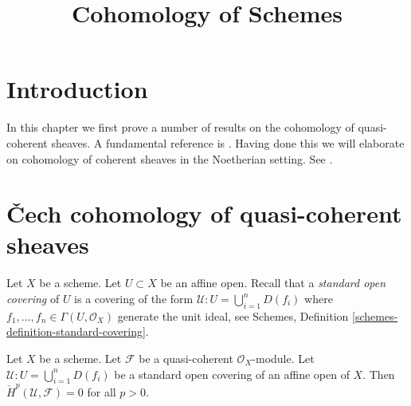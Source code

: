 

%


\title{Cohomology of Schemes}


\maketitle

\label{section-phantom}

\tableofcontents

\section{Introduction}
\label{section-introduction}

\noindent
In this chapter we first prove a number of results on the cohomology of
quasi-coherent sheaves. A fundamental reference is \cite{EGA}.
Having done this we will elaborate on cohomology of
coherent sheaves in the Noetherian setting. See \cite{FAC}.







\section{{\v C}ech cohomology of quasi-coherent sheaves}
\label{section-cech-quasi-coherent}

\noindent
Let $X$ be a scheme.
Let $U \subset X$ be an affine open.
Recall that a {\it standard open covering} of $U$ is a covering
of the form $\mathcal{U} : U = \bigcup_{i = 1}^n D(f_i)$
where $f_1, \ldots, f_n \in \Gamma(U, \mathcal{O}_X)$ generate
the unit ideal, see
Schemes, Definition \ref{schemes-definition-standard-covering}.

\begin{lemma}
\label{lemma-cech-cohomology-quasi-coherent-trivial}
Let $X$ be a scheme.
Let $\mathcal{F}$ be a quasi-coherent $\mathcal{O}_X$-module.
Let $\mathcal{U} : U = \bigcup_{i = 1}^n D(f_i)$ be a standard
open covering of an affine open of $X$.
Then $\check{H}^p(\mathcal{U}, \mathcal{F}) = 0$ for
all $p > 0$.
\end{lemma}

